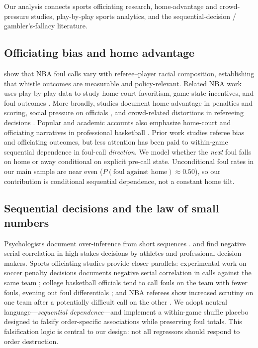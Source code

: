 \label{sec:literature}

Our analysis connects sports officiating research, home-advantage and crowd-pressure studies, play-by-play sports analytics, and the sequential-decision / gambler's-fallacy literature.

\subsection{Officiating bias and home advantage}

\citet{pricewolfers2010} show that NBA foul calls vary with referee--player racial composition, establishing that whistle outcomes are measurable and policy-relevant. Related NBA work uses play-by-play data to study home-court favoritism, game-state incentives, and foul outcomes \citep{price2012}. More broadly, studies document home advantage in penalties and scoring, social pressure on officials \citep{garicano2005,dawson2010,buraimo2010}, and crowd-related distortions in refereeing decisions \citep{page2010}. Popular and academic accounts also emphasize home-court and officiating narratives in professional basketball \citep{moskowitz2011}. Prior work studies referee bias and officiating outcomes, but less attention has been paid to within-game sequential dependence in foul-call \emph{direction}. We model whether the \emph{next} foul falls on home or away conditional on explicit pre-call state. Unconditional foul rates in our main sample are near even ($P(\text{foul against home})\approx 0.50$), so our contribution is conditional sequential dependence, not a constant home tilt.

\subsection{Sequential decisions and the law of small numbers}

Psychologists document over-inference from short sequences \citep{tversky1971}. \citet{pope2011} and \citet{chen2016} find negative serial correlation in high-stakes decisions by athletes and professional decision-makers. Sports-officiating studies provide closer parallels: experimental work on soccer penalty decisions documents negative serial correlation in calls against the same team \citep{plessner2001}; college basketball officials tend to call fouls on the team with fewer fouls, evening out foul differentials \citep{anderson2009}; and NBA referees show increased scrutiny on one team after a potentially difficult call on the other \citep{gift2015}. We adopt neutral language---\emph{sequential dependence}---and implement a within-game shuffle placebo designed to falsify order-specific associations while preserving foul totals. This falsification logic is central to our design: not all regressors should respond to order destruction.

